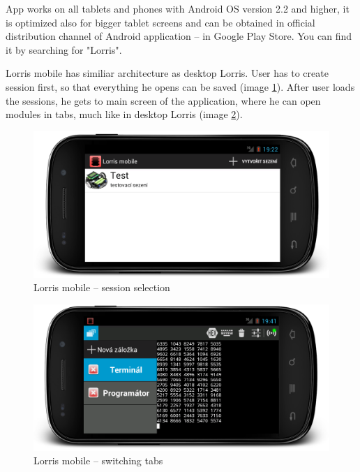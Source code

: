 \documentclass[12pt, a4paper, oneside]{article}
\begin{document}
App works on all tablets and phones with Android OS version 2.2 and higher, it is optimized also for bigger tablet screens and can be obtained in official distribution channel of Android application -- in Google Play Store\cite{gplay}. You can find it by searching for "Lorris".

Lorris mobile has similiar architecture as desktop Lorris. User has to create session first, so that everything he opens can be saved (image \ref{mobile_session}). After user loads the sessions, he gets to main screen of the application, where he can open modules in tabs, much like in desktop Lorris (image \ref{mobile_tabs}).

\begin{figure}[H]
\begin{center}
\includegraphics[width=\textwidth]{img/mobile_session.png}
\caption{Lorris mobile -- session selection}
\label{mobile_session}
\end{center}
\end{figure}
\begin{figure}[H]
\begin{center}
\includegraphics[width=\textwidth]{img/mobile_tabs.png}
\caption{Lorris mobile -- switching tabs}
\label{mobile_tabs}
\end{center}
\end{figure}
\end{document}
